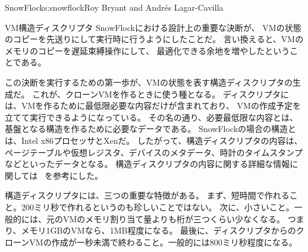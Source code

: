 \begin{aosachapter}{SnowFlock}{s:snowflock}{Roy Bryant and Andr\'e{s} Lagar-Cavilla}
\begin{aosasect1}{VM構造ディスクリプタ}
SnowFlockにおける設計上の重要な決断が、
VMの状態のコピーを先送りにして実行時に行うようにしたことだ。
言い換えると、VMのメモリのコピーを遅延束縛操作にして、
最適化できる余地を増やしたということである。

この決断を実行するための第一歩が、VMの状態を表す構造ディスクリプタの生成だ。
これが、クローンVMを作るときに使う種となる。
ディスクリプタには、VMを作るために最低限必要な内容だけが含まれており、
VMの作成予定を立てて実行できるようになっている。
その名の通り、必要最低限な内容とは、基盤となる構造を作るために必要なデータである。
SnowFlockの場合の構造とは、Intel x86プロセッサとXenだ。
したがって、構造ディスクリプタの内容は、
ページテーブルや仮想レジスタ、デバイスのメタデータ、時計のタイムスタンプなどといったデータとなる。
構造ディスクリプタの内容に関する詳細な情報に関しては
~\cite{bib:snowflocktocs}を参考にした。

構造ディスクリプタには、三つの重要な特徴がある。
まず、短時間で作れること。200ミリ秒で作れるというのも珍しいことではない。
次に、小さいこと。一般的には、元のVMのメモリ割り当て量よりも桁が三つくらい少なくなる。
つまり、メモリ1GBのVMなら、1MB程度になる。
最後に、ディスクリプタからのクローンVMの作成が一秒未満で終わること。一般的には800ミリ秒程度になる。


\end{aosasect1}
\end{aosachapter}
